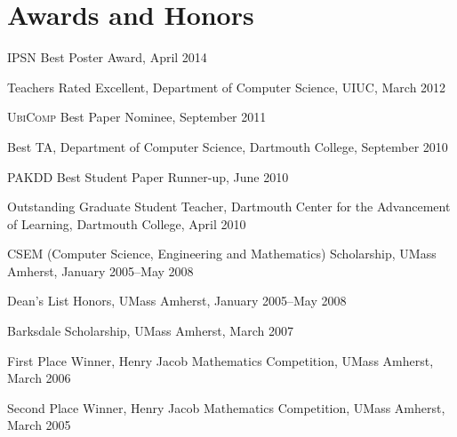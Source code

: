 
\section{\sc Awards and Honors}

\textsc{IPSN} Best Poster Award, April 2014
\vspace*{-2.5mm}

Teachers Rated Excellent, Department of Computer Science, UIUC, March 2012
\vspace*{-2.5mm}

\textsc{UbiComp} Best Paper Nominee, September 2011
\vspace*{-2.5mm}

Best TA, Department of Computer Science, Dartmouth College, September 2010
\vspace*{-2.5mm}

\textsc{PAKDD} Best Student Paper Runner-up, June 2010
\vspace*{-2.5mm}

Outstanding Graduate Student Teacher, Dartmouth
Center for the Advancement of Learning, Dartmouth College, April 2010
\vspace*{-2.5mm}

CSEM (Computer Science, Engineering and Mathematics) Scholarship,
UMass Amherst, January 2005--May 2008
\vspace*{-2.5mm}

Dean's List Honors, UMass Amherst, January 2005--May 2008
\vspace*{-2.5mm}

Barksdale Scholarship, UMass Amherst, March 2007
\vspace*{-2.5mm}

First Place Winner, Henry Jacob Mathematics
Competition, UMass Amherst, March 2006
\vspace*{-2.5mm}

Second Place Winner, Henry Jacob Mathematics
Competition, UMass Amherst, March 2005
\vspace*{-2.5mm}
